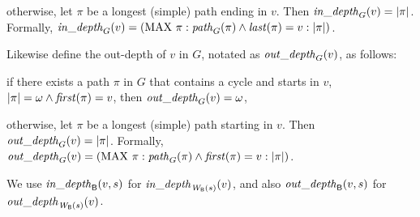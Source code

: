 \item otherwise, let $\pi$ be a longest (simple) path ending in $v$. Then $\mathit{in\_depth}_{G}({v}) = |\pi|$.
\ee
Formally, $\mathit{in\_depth}_{G}({v}) = (\mathrm{MAX}\ \pi : \mathit{path}_{G}(\pi) \land \mathit{last}(\pi) = v : |\pi|)$.

Likewise define the out-depth of $v$ in $G$, notated as
$\mathit{out\_depth}_{G}({v})$, as follows:
\be
\item if there exists a path $\pi$ in $G$ that contains a cycle and starts in $v$, \ie $|\pi| = \omega
  \land \mathit{first}(\pi) = v$, then $\mathit{out\_depth}_{G}({v}) = \omega$,

\item otherwise, let $\pi$ be a longest (simple) path starting in $v$. Then $\mathit{out\_depth}_{G}({v}) = |\pi|$.
\ee
Formally, $\mathit{out\_depth}_{G}({v}) = (\mathrm{MAX}\ \pi : \mathit{path}_{G}(\pi) \land \mathit{first}(\pi) = v : |\pi|)$.
\ed

\noindent
We use $\mathit{in\_depth}_{\mathsf{B}}({v, s})$ for $\mathit{in\_depth}_{\mathit{W}_{\mathsf{B}}({s})}({v})$, and also
$\mathit{out\_depth}_{\mathsf{B}}({v, s})$ for $\mathit{out\_depth}_{\mathit{W}_{\mathsf{B}}({s})}({v})$.






